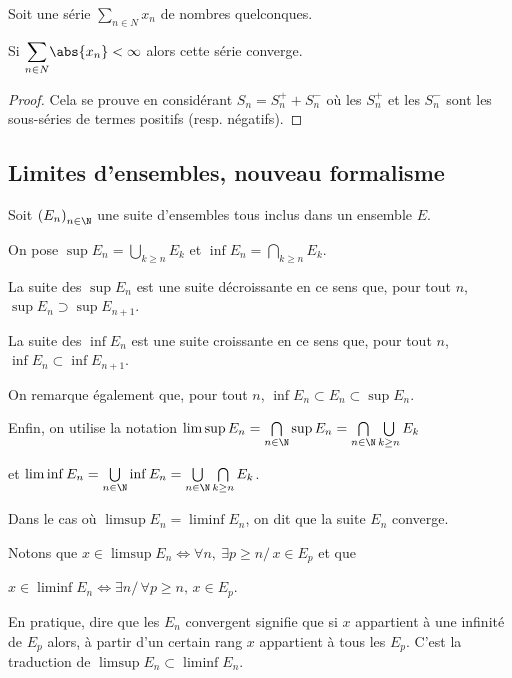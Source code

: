 \begin{prop}
Soit une série $\displaystyle{\sum \limits_{n \in N}} x_n$ de nombres quelconques.

Si $\displaystyle{\sum \limits_{n \in N}} \abs{x_n} < \infty$ alors cette série converge.
\end{prop}

\begin{proof}
Cela se prouve en considérant $S_n = S_n^{+}+S_n^{-}$ où les $S_n^{+}$ et les $S_n^{-}$ sont les sous-séries de termes positifs (resp. négatifs).
\end{proof}

\subsection{Limites d'ensembles, nouveau formalisme}

Soit $\left(E_n\right)_{n \in \N}$ une suite d'ensembles tous inclus dans un ensemble $E$.

On pose $\sup E_n = \bigcup \limits_{k \geq n} E_k$ et $\inf E_n = \bigcap \limits_{k \geq n} E_k$.

La suite des $\sup E_n$ est une suite décroissante en ce sens que, pour tout $n$, $\sup E_n \supset \sup E_{n+1}$.

La suite des $\inf E_n$ est une suite croissante en ce sens que, pour tout $n$, $\inf E_n \subset \inf E_{n+1}$.

On remarque également que, pour tout $n$, $\inf E_n \subset E_n \subset \sup E_n$.

Enfin, on utilise la notation $\limsup E_n = \bigcap \limits_{n \in \N} \sup E_n = \bigcap \limits_{n \in \N} \bigcup \limits_{k \geq n} E_k$ 

et $\liminf E_n = \bigcup \limits_{n \in \N} \inf E_n = \bigcup \limits_{n \in \N} \bigcap \limits_{k \geq n} E_k$.

Dans le cas où $\limsup E_n = \liminf E_n$, on dit que la suite $E_n$ converge.

Notons que $x \in \limsup E_n \iff \forall n, \ \exists p \geq n/ \, x \in E_p$ et que

$x \in \liminf E_n \iff \exists n/ \, \forall p \geq n, \, x \in E_p$.

En pratique, dire que les $E_n$ convergent signifie que si $x$ appartient à une infinité de $E_p$ alors, à partir d'un certain rang $x$ appartient à tous les $E_p$. C'est la traduction de $\limsup E_n \subset \liminf E_n$.


